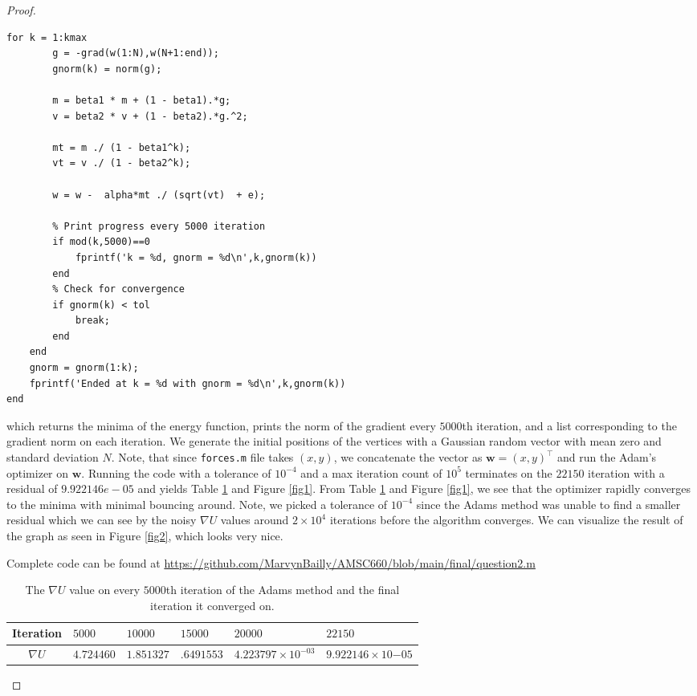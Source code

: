 \documentclass[12pt]{report}
\newenvironment{problem}{}{\newpage}
\begin{document}
\begin{problem}
\begin{proof}
\begin{lstlisting}[style=Matlab-editor]
    for k = 1:kmax
        g = -grad(w(1:N),w(N+1:end));
        gnorm(k) = norm(g);

        m = beta1 * m + (1 - beta1).*g;
        v = beta2 * v + (1 - beta2).*g.^2;

        mt = m ./ (1 - beta1^k);
        vt = v ./ (1 - beta2^k);
        
        w = w -  alpha*mt ./ (sqrt(vt)  + e);
        
        % Print progress every 5000 iteration
        if mod(k,5000)==0
            fprintf('k = %d, gnorm = %d\n',k,gnorm(k))
        end
        % Check for convergence
        if gnorm(k) < tol
            break;
        end
    end
    gnorm = gnorm(1:k);
    fprintf('Ended at k = %d with gnorm = %d\n',k,gnorm(k))
end  
\end{lstlisting}
which returns the minima of the energy function, prints the norm of the gradient every $5000$th iteration, and a list corresponding to the  gradient norm on each iteration. We generate the initial positions of the vertices with a Gaussian random vector with mean zero and standard deviation $N$. Note, that since \verb+forces.m+ file takes $(x,y)$, we concatenate the vector as $\mathbf{w} = (x,y)^\top$ and run the Adam's optimizer on $\mathbf{w}$. Running the code with a tolerance of $10^{-4}$ and a max iteration count of $10^{5}$ terminates on the $22150$ iteration with a residual of $9.922146e-05$ and yields Table \ref{tablefor1} and Figure \ref{fig1}. From Table \ref{tablefor1} and Figure \ref{fig1}, we see that the optimizer rapidly converges to the minima with minimal bouncing around. Note, we picked a tolerance of $10^{-4}$ since the Adams method was unable to find a smaller residual which we can see by the noisy $\nabla U$ values around $2\times 10^4$ iterations before the algorithm converges. We can visualize the result of the graph as seen in Figure \ref{fig2}, which looks very nice. 

\noindent
Complete code can be found at \url{https://github.com/MarvynBailly/AMSC660/blob/main/final/question2.m} 

\begin{table}[h!] 
    \center
    \begin{tabular}{c|lllll}
     Iteration &  $5000$&  $10000$& $15000$ & $20000$ & $22150$\\ \hline
     $\nabla U $& $4.724460$ & $1.851327$ & $.6491553$ &  $4.223797\times 10^{-03}$ & $9.922146\times10{-05}$\\ 
    \end{tabular}
    \caption{The $\nabla U$ value on every $5000$th iteration of the Adams method and the final iteration it converged on.}
    \label{tablefor1}
\end{table}


\end{proof}
\end{problem}
\end{document}
